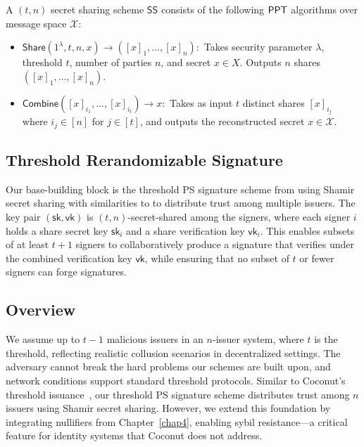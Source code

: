 \begin{definition}
A $(t,n)$ secret sharing scheme $\mathsf{SS}$ consists of the following $\mathsf{PPT}$ algorithms over message space $\mathcal{X}$:
\begin{itemize}
    \item $\mathsf{Share}(1^{\lambda}, t, n, x) \to ([x]_1, \dots, [x]_n):$ Takes security parameter $\lambda$, threshold $t$, number of parties $n$, and secret $x \in X$. Outputs $n$ shares $([x]_1, \dots, [x]_n)$.
    
    \item $\mathsf{Combine}([x]_{i_1}, \dots, [x]_{i_t}) \to x:$ Takes as input $t$ distinct shares $[x]_{i_j}$ where $i_j \in [n]$ for $j \in [t]$, and outputs the reconstructed secret $x \in \mathcal{X}$.
\end{itemize}
\end{definition}




\subsection{Threshold Rerandomizable Signature}

Our base-building block is the threshold PS signature scheme from \cite{tomescu_utt_2022} using Shamir secret sharing with similarities to \cite{sonnino_coconut_2020} to distribute trust among multiple issuers. The key pair $(\mathsf{sk}, \mathsf{vk})$ is $(t,n)$-secret-shared among the signers, where each signer $i$ holds a share secret key $\mathsf{sk}_i$ and a share verification key $\mathsf{vk}_i$. This enables subsets of at least $t+1$ signers to collaboratively produce a signature that verifies under the combined verification key $\mathsf{vk}$, while ensuring that no subset of $t$ or fewer signers can forge signatures.


\subsection{Overview}
We assume up to $t-1$ malicious issuers in an $n$-issuer system, where $t$ is the threshold, reflecting realistic collusion scenarios in decentralized settings. The adversary cannot break the hard problems our schemes are built upon, and network conditions support standard threshold protocols. Similar to Coconut’s threshold issuance~\cite{sonnino_coconut_2020}, our threshold PS signature scheme distributes trust among $n$ issuers using Shamir secret sharing. However, we extend this foundation by integrating nullifiers from Chapter~\ref{chap4}, enabling sybil resistance—a critical feature for identity systems that Coconut does not address.

